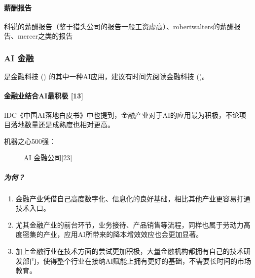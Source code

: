 \documentclass[letterpaper,10pt,english]{sphinxmanual}
\begin{document}
\paragraph{薪酬报告}
\label{\detokenize{chapter_project/AI_talents:id16}}
科锐的薪酬报告（鉴于猎头公司的报告一般工资虚高）、robertwalters的薪酬报告、mercer之类的报告
%
\begin{footnote}[752]\sphinxAtStartFootnote
{}
%
\end{footnote}


\subsubsection{AI 金融}
\label{\detokenize{chapter_project/AI_Finance:ai}}\label{\detokenize{chapter_project/AI_Finance::doc}}
是金融科技 {\hyperref[\detokenize{chapter_AI+Finance/FinTech:fintech}]{}} () 的其中一种AI应用，建议有时间先阅读金融科技
{\hyperref[\detokenize{chapter_AI+Finance/FinTech:fintech}]{}} ()。


\paragraph{金融业结合AI最积极 {[}13{]}}
\label{\detokenize{chapter_project/AI_Finance:ai-13}}
IDC《中国AI落地白皮书》中也提到，金融产业对于AI的应用最为积极，不论项目落地数量还是成熟度也相对更高。

机器之心500强：

\begin{figure}[H]
\centering
\capstart

\noindent{}
\caption{AI 金融公司{[}23{]}}\label{\detokenize{chapter_project/AI_Finance:id31}}\end{figure}


\subparagraph{为何？}
\label{\detokenize{chapter_project/AI_Finance:id1}}\begin{enumerate}
%
\item {} 
金融产业凭借自己高度数字化、信息化的良好基础，相比其他产业更容易打通技术入口。

\item {} 
尤其金融产业的前台环节，业务接待、产品销售等流程，同样也属于劳动力高度密集的产业，应用AI所带来的降本增效效应也会更加显著。

\item {} 
加上金融行业在技术方面的尝试更加积极，大量金融机构都拥有自己的技术研发部门，使得整个行业在接纳AI赋能上拥有更好的基础，不需要长时间的市场教育。

\end{enumerate}
\end{document}
